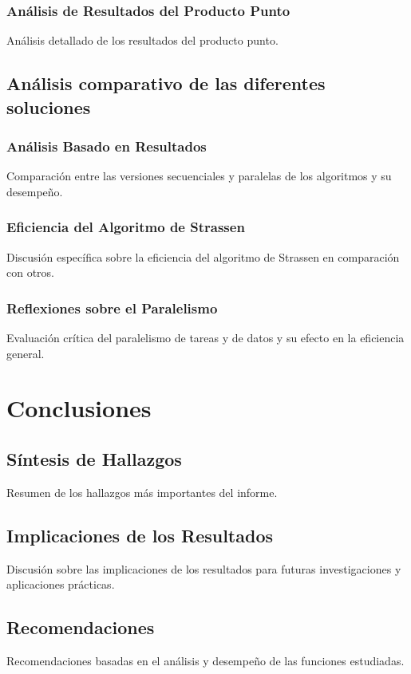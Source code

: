 \documentclass[12pt, a4paper]{article}
\begin{document}
\subsubsection{Análisis de Resultados del Producto Punto}
Análisis detallado de los resultados del producto punto.

\subsection{Análisis comparativo de las diferentes soluciones}
\subsubsection{Análisis Basado en Resultados}
Comparación entre las versiones secuenciales y paralelas de los algoritmos y su desempeño.
\subsubsection{Eficiencia del Algoritmo de Strassen}
Discusión específica sobre la eficiencia del algoritmo de Strassen en comparación con otros.
\subsubsection{Reflexiones sobre el Paralelismo}
Evaluación crítica del paralelismo de tareas y de datos y su efecto en la eficiencia general.

\section{Conclusiones}
\subsection{Síntesis de Hallazgos}
Resumen de los hallazgos más importantes del informe.
\subsection{Implicaciones de los Resultados}
Discusión sobre las implicaciones de los resultados para futuras investigaciones y aplicaciones prácticas.
\subsection{Recomendaciones}
Recomendaciones basadas en el análisis y desempeño de las funciones estudiadas.
\end{document}
